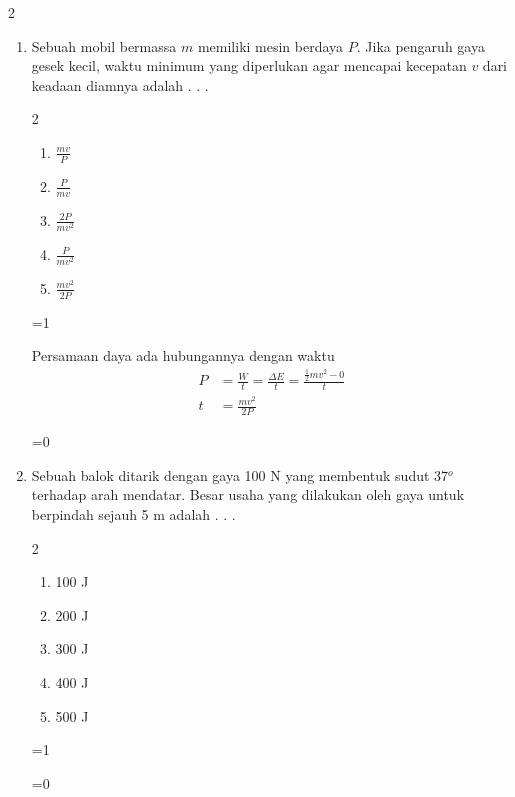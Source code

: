 \documentclass[10pt,a4paper]{article}
\def\tampilkunci{1}
\newcommand{\hide}[1]{\ifnum\tampilkunci=1
%
\begin{mybox}
 #1
\end{mybox}
%
\vspace{\baselineskip}\fi\ifnum\tampilkunci=0
%
%
\fi}
\newcommand{\pilgani}[1]{                            \vspace{-0.3cm}\begin{multicols}{2}
 \begin{enumerate}[label=\Alph*., itemsep=0pt,topsep=0pt,leftmargin=*,align=Center]#1                     \end{enumerate}
 \phantom{ini cuma sapi, wedus, dan ayam}
 \end{multicols}}
\begin{document}
\begin{multicols*}{2}
\begin{enumerate}
\item Sebuah mobil bermassa $m$ memiliki mesin berdaya $P$. Jika pengaruh gaya gesek kecil, waktu minimum yang diperlukan agar mencapai kecepatan $v$ dari keadaan diamnya adalah . . .
\pilgani{
	\item $\frac{mv}{P}$
	\item $\frac{P}{mv}$
	\item $\frac{2P}{mv^2}$
	\item $\frac{P}{mv^2}$
	\item $\frac{mv^2}{2P}$
	}
\hide{ Persamaan daya ada hubungannya dengan waktu
	\begin{align*}
	P&=\frac{W}{t}=\frac{\Delta E}{t}=\frac{\frac{1}{2}mv^2-0}{t}\\
	t&=\frac{mv^2}{2P}
	\end{align*}
	}
	
\item Sebuah balok ditarik dengan gaya 100 N yang membentuk sudut 37$^o$ terhadap arah mendatar. Besar usaha yang dilakukan oleh gaya untuk berpindah sejauh 5 m adalah . . . 
\pilgani{
	\item 100 J
	\item 200 J
	\item 300 J
	\item 400 J
	\item 500 J
	}
\hide{
	}
\end{enumerate}
\end{multicols*} 
\end{document}
